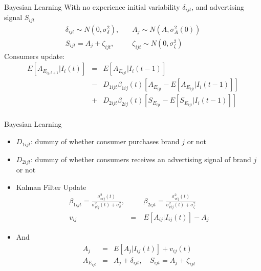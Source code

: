 \documentclass[xcolor=pdftex,dvipsnames,table,mathserif,aspectratio=169]{beamer}
\begin{document}
\begin{frame}{Bayesian Learning}
With no experience initial variability $\delta_{ijt}$, and advertising signal $S_{ijt}$
\begin{eqnarray*}
\delta_{ijt} \sim N(0,\sigma_{\delta}^2),  \quad& A_j \sim N(A,\sigma_A^2(0))\\
S_{ijt} = A_j + \zeta_{ijt}, \quad &\zeta_{ijt} \sim N(0,\sigma_{\zeta}^2)
\end{eqnarray*}
Consumers update:
\begin{eqnarray*}
E[A_{E_{ij,t+1}} | I_i(t)] &=&  E[A_{E_{ijt}} | I_i(t-1)] \\
 &-& D_{1ijt} \beta_{1ij}(t) [A_{E_{ijt}} - E[A_{E_{ijt}} | I_i(t-1)] ] \\
 &+&D_{2ijt} \beta_{2ij}(t) [S_{E_{ijt}} - E[S_{E_{ijt}} | I_i(t-1)] ] \\
\end{eqnarray*}
\end{frame}

\begin{frame}{Bayesian Learning}
\begin{itemize}
\item $D_{1ijt}$: dummy of whether consumer purchases brand $j$ or not
\item $D_{2ijt}$: dummy of whether consumers receives an advertising signal of brand $j$ or not
\item Kalman Filter Update
\begin{eqnarray*}
\beta_{1ijt} = \frac{ \sigma_{vij}^2(t)} { \sigma_{vij}^2(t) + \sigma_{\delta}^2}, &\quad& 
\beta_{2ijt} = \frac{ \sigma_{vij}^2(t)} { \sigma_{vij}^2(t) + \sigma_{\zeta}^2}\\
v_{ij} &=& E[A_{ij} | I_{ij}(t)] - A_j
\end{eqnarray*} 
\item And
\begin{eqnarray*}
A_{j} &=& E[A_j | I_{ij}(t)] + v_{ij}(t)\\
A_{E_{ijt}} &=& A_j + \delta_{ijt} , \quad S_{ijt} = A_j + \zeta_{ijt}
\end{eqnarray*} 
\end{itemize}
\end{frame}
\end{document}
